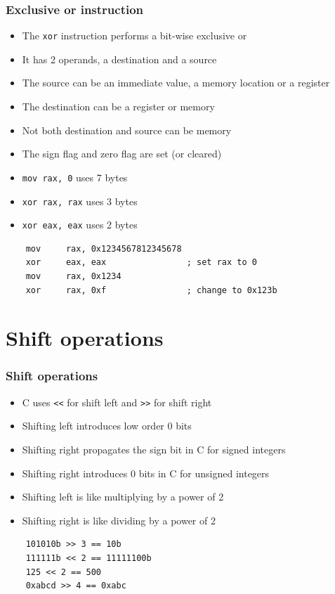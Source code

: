 \documentclass{beamer}
\begin{document}
\begin{frame}[fragile]
    \frametitle{Exclusive or instruction}
    \begin{itemize}
        \item The {\tt xor} instruction performs a bit-wise exclusive
              or
        \item It has 2 operands, a destination and a source
        \item The source can be an immediate value, a memory location
              or a register
        \item The destination can be a register or memory
        \item Not both destination and source can be memory
        \item The sign flag and zero flag are set (or cleared)
        \item {\tt mov rax, 0} uses 7 bytes
        \item {\tt xor rax, rax} uses 3 bytes
        \item {\tt xor eax, eax} uses 2 bytes
    \end{itemize}
\begin{verbatim}
    mov     rax, 0x1234567812345678
    xor     eax, eax                ; set rax to 0
    mov     rax, 0x1234
    xor     rax, 0xf                ; change to 0x123b
\end{verbatim}
\end{frame}

\section{Shift operations}

\begin{frame}[fragile]
    \frametitle{Shift operations}
    \begin{itemize}
        \item C uses {\tt <<} for shift left and {\tt >>} for shift
              right
        \item Shifting left introduces low order 0 bits
        \item Shifting right propagates the sign bit in C for
              signed integers
        \item Shifting right introduces 0 bits in C for
              unsigned integers
        \item Shifting left is like multiplying by a power of 2
        \item Shifting right is like dividing by a power of 2
    \end{itemize}
\begin{verbatim}
    101010b >> 3 == 10b
    111111b << 2 == 11111100b
    125 << 2 == 500
    0xabcd >> 4 == 0xabc
\end{verbatim}
\end{frame}
\end{document}
